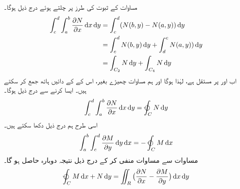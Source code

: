  مساوات     کے ثبوت کی طرز پر چلتے ہوئے  درج ذیل ہوگا۔ 
 \begin{gather}
\begin{aligned}\label{مساوات_سمتی_تکمل_درمیان_ثبوت}
     \int_{c}^{d} \int_{a}^{b} \frac{\partial N}{\partial x} \dif x \dif y &= \int_{c}^{d} (N(b,y)-N(a,y)) \dif y\\  
        &= \int_{c}^{d} N(b,y) \dif y + \int_{d}^{c} N(a,y)) \dif y\\   
          &= \int_{C_2} N \dif y + \int_{C_4} N \dif y 
\end{aligned}
\end{gather}
 اب  اور   پر   مستقل ہے،  لہٰذا  ہوگا اور ہم مساوات       چھیڑے بغیر، اس کے کے دائیں ہاتھ  جمع کر سکتے ہیں۔ ایسا کرنے سے درج ذیل ہوگا۔  
\begin{align}\label{مساوات_سمتی_تکمل_نتیجہ_الف}
     \int_c^d \int_{a}^{b} \frac{\partial N}{\partial x} \dif x \dif y = \varointctrclockwise_C N \dif y 
\end{align}
 اسی طرح ہم  درج ذیل  دکھا سکتے ہیں۔ 
\begin{align}\label{مساوات_سمتی_تکمل_نتیجہ_ب}
     \int_{a}^{b} \int_c^d  \frac{\partial M}{\partial y} \dif y \dif x  = -\varointctrclockwise_C M \dif x 
\end{align}
 مساوات     سے مساوات     منفی کر کے  درج ذیل نتیجہ   دوبارہ حاصل ہو گا۔ 
\begin{align}
\varointctrclockwise_C M \dif x + N \dif y = \iint_R \big(\frac{\partial N}{\partial x} - \frac{\partial M}{\partial y}\big) \dif x \dif y 
\end{align}

